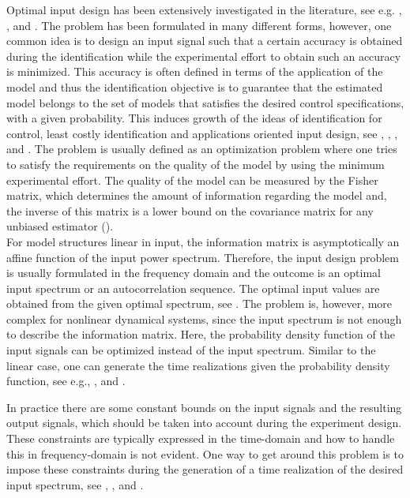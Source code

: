 \documentclass{ifacconf}
\begin{document}
Optimal input design has been extensively investigated in the literature, see e.g. \cite{L.Ljung1999}, \cite{Goodwin&Payne:77}, and \cite{Bombois&Gilson:06SYSID}. The problem has been formulated in many different forms, however, one common idea is to design an input signal such that a certain accuracy is obtained during the identification while the experimental effort to obtain such an accuracy is minimized. This accuracy is often defined in terms of the application of the model and thus the identification objective is to guarantee that the estimated model belongs to the set of models that satisfies the desired control specifications, with a given probability. This induces growth of the ideas of identification for control, least costly identification and applications oriented input design, see \cite{hjalmars:04}, \cite{Gevers&Ljung:86}, \cite{Bombois&Gilson:06SYSID}, and \cite{Hjalmarsson2009}. The problem is usually defined as an optimization problem where one tries to satisfy the requirements on the quality of the model by using the minimum experimental effort. 
The quality of the model can be measured by the Fisher matrix, which determines the amount of information regarding the model and, the inverse of this matrix is a lower bound on the covariance matrix for any unbiased estimator (\cite{L.Ljung1999}). 
\\
For model structures linear in input, the information matrix is asymptotically an affine function of the input power spectrum. Therefore, the input design problem is usually formulated in the frequency domain and the outcome is an optimal input spectrum or an autocorrelation sequence. The optimal input values are obtained from the given optimal spectrum, see \cite{Fedorov:72}. The problem is, however, more complex for nonlinear dynamical systems, since the input spectrum is not enough to describe the information matrix. Here, the probability density function of the input signals can be optimized instead of the input spectrum. Similar to the linear case, one can generate the time realizations given the probability density function, see e.g., \cite{Pato2013}, and \cite{Forgione2014}.

In practice there are some constant bounds on the input signals and the resulting output signals, which should be taken into account during the experiment design. These constraints are typically expressed in the time-domain and how to handle this in frequency-domain is not evident. One way to get around this problem is to impose these constraints during the generation of a time realization of the desired input spectrum, see \cite{Gujar:68}, \cite{Liu:82}, \cite{Schroede1970} and \cite{LarssonPer2013} .
\end{document}
